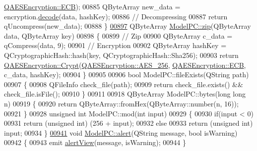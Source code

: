 \begin{DoxyCode}
{      \hyperlink{class_q_a_e_s_encryption_ad3e031c49a3d56566379d75b40b7b255a4ca7f51778e2adf1f464164a0ba8e75e}{QAESEncryption::ECB});
00885     QByteArray new\_data = encryption.\hyperlink{class_q_a_e_s_encryption_a58f972f2b66c2454edd5112495463bba}{decode}(data, hashKey);
00886     \textcolor{comment}{// Decompressing}
00887     \textcolor{keywordflow}{return} qUncompress(new\_data);
00888 \}
\hypertarget{modelpc_8cpp_source.tex_l00897}{}\hyperlink{class_model_p_c_afebbbfa4b07deba4f68fc6dfb50f353f}{00897} QByteArray \hyperlink{class_model_p_c_afebbbfa4b07deba4f68fc6dfb50f353f}{ModelPC::zip}(QByteArray data, QByteArray key)
00898 \{
00899     \textcolor{comment}{// Zip}
00900     QByteArray c\_data = qCompress(data, 9);
00901     \textcolor{comment}{// Encryption}
00902     QByteArray hashKey = QCryptographicHash::hash(key, QCryptographicHash::Sha256);
00903     \textcolor{keywordflow}{return} \hyperlink{class_q_a_e_s_encryption_a43819eeb6a7cb29fbd3cb6ad640dcbdf}{QAESEncryption::Crypt}(\hyperlink{class_q_a_e_s_encryption_abe48208f4f6c7d68e6a10b49b9d0b7bdacde97774ab1d4c609e04b0dd13a1e1f7}{QAESEncryption::AES\_256}, 
      \hyperlink{class_q_a_e_s_encryption_ad3e031c49a3d56566379d75b40b7b255a4ca7f51778e2adf1f464164a0ba8e75e}{QAESEncryption::ECB}, c\_data, hashKey);
00904 \}
00905 
00906 \textcolor{keywordtype}{bool} ModelPC::fileExists(QString path)
00907 \{
00908     QFileInfo check\_file(path);
00909     \textcolor{keywordflow}{return} check\_file.exists() && check\_file.isFile();
00910 \}
00911 
00918 QByteArray ModelPC::bytes(\textcolor{keywordtype}{long} \textcolor{keywordtype}{long} n)
00919 \{
00920     \textcolor{keywordflow}{return} QByteArray::fromHex(QByteArray::number(n, 16));
00921 \}
00928 \textcolor{keywordtype}{unsigned} \textcolor{keywordtype}{int} ModelPC::mod(\textcolor{keywordtype}{int} input)
00929 \{
00930     \textcolor{keywordflow}{if}(input < 0)
00931         \textcolor{keywordflow}{return} (\textcolor{keywordtype}{unsigned} \textcolor{keywordtype}{int}) (256 + input);
00932     \textcolor{keywordflow}{else}
00933         \textcolor{keywordflow}{return} (\textcolor{keywordtype}{unsigned} \textcolor{keywordtype}{int}) input;
00934 \}
\hypertarget{modelpc_8cpp_source.tex_l00941}{}\hyperlink{class_model_p_c_a9079a101d83672aa48fd2dbac797de40}{00941} \textcolor{keywordtype}{void} \hyperlink{class_model_p_c_a9079a101d83672aa48fd2dbac797de40}{ModelPC::alert}(QString message, \textcolor{keywordtype}{bool} isWarning)
00942 \{
00943     emit \hyperlink{class_model_p_c_af0217a7ca5671e26090dc50a5dccdaf5}{alertView}(message, isWarning);
00944 \}
}
\end{DoxyCode}
